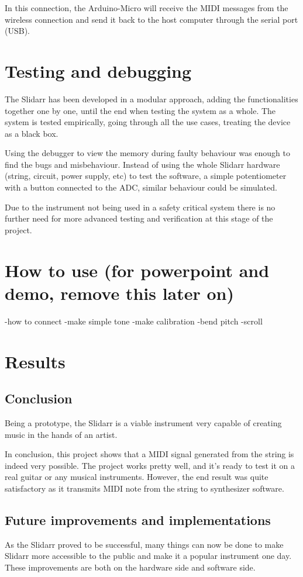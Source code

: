 \documentclass{article}
\begin{document}
In this connection, the Arduino-Micro will receive the MIDI messages from the wireless connection and send it back to the host computer through the serial port (USB). 

\section{Testing and debugging}
The Slidarr has been developed in a modular approach, adding the functionalities together one by one, until the end when testing the system as a whole. The system is tested empirically, going through all the use cases, treating the device as a black box.

Using the debugger to view the memory during faulty behaviour was enough to find the bugs and misbehaviour. Instead of using the whole Slidarr hardware (string, circuit, power supply, etc) to test the software, a simple potentiometer with a button connected to the ADC, similar behaviour could be simulated.

Due to the instrument not being used in a safety critical system there is no further need for more advanced testing and verification at this stage of the project.

\section{How to use (for powerpoint and demo, remove this later on)}
-how to connect
-make simple tone
-make calibration
-bend pitch
-scroll

\section{Results}

\subsection{Conclusion}
Being a prototype, the Slidarr is a viable instrument very capable of creating music in the hands of an artist.

In conclusion, this project shows that a MIDI signal generated from the string is indeed very possible.
The project works pretty well, and it's ready to test it on a real guitar or any musical instruments. However, the end result was quite satisfactory as it transmits MIDI note from the string to synthesizer software.

\subsection{Future improvements and implementations}
As the Slidarr proved to be successful, many things can now be done to make Slidarr more accessible to the public and make it a popular instrument one day. These improvements are both on the hardware side and software side.
\end{document}
